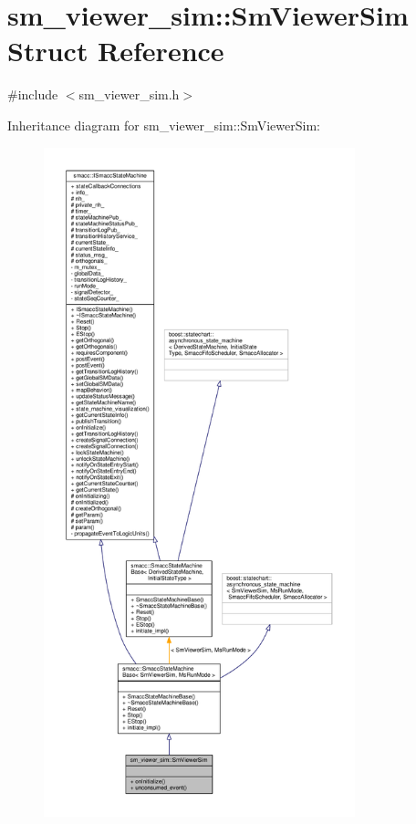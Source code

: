 \hypertarget{structsm__viewer__sim_1_1SmViewerSim}{}\section{sm\+\_\+viewer\+\_\+sim\+:\+:Sm\+Viewer\+Sim Struct Reference}
\label{structsm__viewer__sim_1_1SmViewerSim}


{\ttfamily \#include $<$sm\+\_\+viewer\+\_\+sim.\+h$>$}



Inheritance diagram for sm\+\_\+viewer\+\_\+sim\+:\+:Sm\+Viewer\+Sim\+:\nopagebreak
\begin{figure}[H]
\begin{center}
\leavevmode
\includegraphics[height=550pt]{structsm__viewer__sim_1_1SmViewerSim__inherit__graph}
\end{center}
\end{figure}


